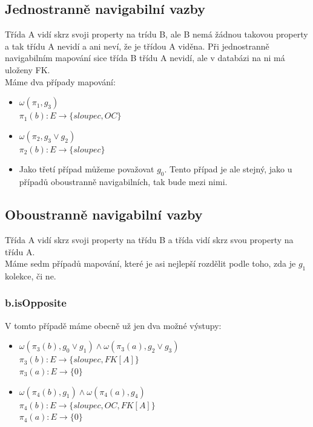 \documentclass[11pt,a4paper]{article}
\begin{document}
   	\subsection{Jednostranně navigabilní vazby}
   		Třída A vidí skrz svoji property na trídu B, ale B nemá žádnou takovou property a 
   		tak třídu A nevidí a ani neví, že je třídou A viděna. Při jednostranně navigabilním
   		mapování sice třída B třídu A nevidí, ale v databázi na ni má uloženy FK.
   		\\
   		Máme dva případy mapování:
   		\begin{itemize}				    
         	\item 			$ \omega(\pi_1,g_3)$\\
         					$\pi_1(b) : E \to \{ sloupec, OC\}$
         					
         	\item         	$\omega(\pi_2, g_3 \vee g_2)$ \\
         					$\pi_2(b) : E \to \{ sloupec\}$
         	\item Jako třetí případ můžeme považovat $g_0$. Tento případ je ale stejný, 
         	jako u případů oboustranně navigabilních, tak bude mezi nimi.	  							
   		\end{itemize}
   	\subsection{Oboustranně navigabilní vazby}
   		Třída A vidí skrz svoji property na třídu B a třída vidí skrz svou property na třídu A. \\
   		Máme sedm případů mapování, které je asi nejlepší rozdělit podle toho, zda je $g_1$ kolekce, či ne.
   		\subsubsection{b.isOpposite}
   		V tomto případě máme obecně už jen dva možné výstupy:
   		   		\begin{itemize}				    
         			\item 
         							$\omega(\pi_3(b), g_0 \vee g_1) \wedge \omega(\pi_3(a), g_2 \vee g_3)$\\
         							$\pi_3(b) : E \to \{ sloupec, FK[A]\}$ \\
         							$\pi_3(a) : E \to \{ 0\}$
         			\item 			$\omega(\pi_4(b), g_1) \wedge \omega(\pi_4(a), g_4)$\\
         							$\pi_4(b) : E \to \{ sloupec, OC, FK[A]\}$ \\
         							$\pi_4(a) : E \to \{ 0\}$  		  							
   				\end{itemize}
\end{document}
